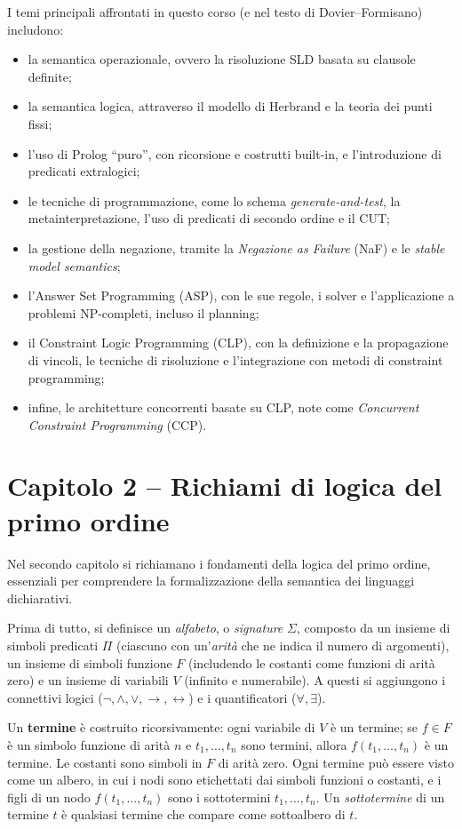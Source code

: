 \documentclass[12pt]{article}
\begin{document}
I temi principali affrontati in questo corso (e nel testo di Dovier–Formisano) includono:
\begin{itemize}
  \item la semantica operazionale, ovvero la risoluzione SLD basata su clausole definite; 
  \item la semantica logica, attraverso il modello di Herbrand e la teoria dei punti fissi; 
  \item l'uso di Prolog ``puro'', con ricorsione e costrutti built-in, e l'introduzione di predicati extralogici; 
  \item le tecniche di programmazione, come lo schema \emph{generate-and-test}, la metainterpretazione, l'uso di predicati di secondo ordine e il CUT; 
  \item la gestione della negazione, tramite la \emph{Negazione as Failure} (NaF) e le \emph{stable model semantics}; 
  \item l'Answer Set Programming (ASP), con le sue regole, i solver e l'applicazione a problemi NP-completi, incluso il planning; 
  \item il Constraint Logic Programming (CLP), con la definizione e la propagazione di vincoli, le tecniche di risoluzione e l'integrazione con metodi di constraint programming; 
  \item infine, le architetture concorrenti basate su CLP, note come \emph{Concurrent Constraint Programming} (CCP).
\end{itemize}

\section*{Capitolo 2 – Richiami di logica del primo ordine}

Nel secondo capitolo si richiamano i fondamenti della logica del primo ordine, essenziali per comprendere la formalizzazione della semantica dei linguaggi dichiarativi.

Prima di tutto, si definisce un \emph{alfabeto}, o \emph{signature} $\Sigma$, composto da un insieme di simboli predicati $\Pi$ (ciascuno con un'\emph{arità} che ne indica il numero di argomenti), un insieme di simboli funzione $F$ (includendo le costanti come funzioni di arità zero) e un insieme di variabili $V$ (infinito e numerabile). A questi si aggiungono i connettivi logici ($\neg,\land,\lor,\rightarrow,\leftrightarrow$) e i quantificatori ($\forall,\exists$).

Un \textbf{termine} è costruito ricorsivamente: ogni variabile di $V$ è un termine; se $f \in F$ è un simbolo funzione di arità $n$ e $t_1,\ldots,t_n$ sono termini, allora $f(t_1,\ldots,t_n)$ è un termine. Le costanti sono simboli in $F$ di arità zero. Ogni termine può essere visto come un albero, in cui i nodi sono etichettati dai simboli funzioni o costanti, e i figli di un nodo $f(t_1,\ldots,t_n)$ sono i sottotermini $t_1,\ldots,t_n$. Un \emph{sottotermine} di un termine $t$ è qualsiasi termine che compare come sottoalbero di $t$.
\end{document}
